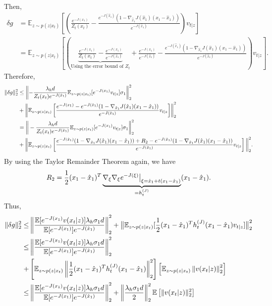 Then, 
\begin{align}
    \nonumber \delta g &= \mathbb{E}_{z \sim p(z|x_t)} 
    \left[
    \left(\frac{e^{-J(x_1)}}{Z_t(x_t)}-\frac{e^{-J(\hat{x}_1)}(1 - \nabla_{\hat{x}_1} J(\hat{x}_1) (x_1 - \hat{x}_1))}{e^{-J(\hat{x}_1)}}\right)v_{t|z}
    \right] \\
    & = \mathbb{E}_{z \sim p(z|x_t)} \left[ 
    \left(\underbrace{\frac{e^{-J({x}_1)}}{Z_t(x_t)} - \frac{e^{-J(x_1)}}{e^{-J(\hat{x}_1)}}}_{\text{Using the error bound of } Z_t} + \frac{e^{-J(x_1)}}{e^{-J(\hat{x}_1)}} -\frac{e^{-J(\hat{x}_1)}(1 - \nabla_{\hat{x}_1} J(\hat{x}_1) (x_1 - \hat{x}_1))}{e^{-J(\hat{x}_1)}}\right)v_{t|z}
    \right].
\end{align}
Therefore,
\begin{align}
    \nonumber \|\delta g\|_2^2& \le \left\|-\frac{\lambda_h d}{Z_t(x_t)e^{-J(\hat{x}_1)}} {\mathbb{E}_{z \sim p(z|x_t)} [e^{-J(x_1)}v_{t|z}]}\sigma_1\right\|_2^2 \\
    \nonumber &+ \left\|\mathbb{E}_{z \sim p(z|x_t)} \left[ 
    \frac{e^{-J(x_1)} - e^{-J(\hat{x}_1)}(1 - \nabla_{\hat{x}_1} J(\hat{x}_1) (x_1 - \hat{x}_1))}{e^{-J(\hat{x}_1)}} v_{t|z}
    \right] \right\|_2^2\\
    \nonumber & = \bigg{\|} -\frac{\lambda_h d}{Z_t(x_t)e^{-J(\hat{x}_1)}} {\mathbb{E}_{z \sim p(z|x_t)} [e^{-J(x_1)}v_{t|z}]}\sigma_1\bigg{\|}_2^2 \\
    & + \bigg{\|}\mathbb{E}_{z \sim p(z|x_t)} \left[ 
    \frac{e^{-J(\hat{x}_1)}(1 - \nabla_{\hat{x}_1} J(\hat{x}_1) (x_1 - \hat{x}_1)) + R_2 - e^{-J(\hat{x}_1)}(1 - \nabla_{\hat{x}_1} J(\hat{x}_1) (x_1 - \hat{x}_1))}{e^{-J(\hat{x}_1)}} v_{t|z}
    \right]\bigg{\|}_2^2.
\end{align}
By using the Taylor Remainder Theorem again, we have 
\begin{equation}
R_2 = \frac{1}{2}(x_1 - \hat{x}_1)^T \underbrace{\nabla_{\xi}\nabla_{\xi} e^{-J(\xi)}\big{|}_{\xi=\hat{x}_1 + t (x_1 - \hat{x}_1)}}_{= h^{(J)}_t}(x_1 - \hat{x}_1).
\end{equation}
Thus,
\begin{align}
    \nonumber \|\delta g\|_2^2\le&\left\|  \frac{\mathbb{E}[e^{-J(x_1)}v(x_t|z)]\lambda_h\sigma_1 d}{\mathbb{E}[e^{-J(x_1)}]e^{-J(\hat{x}_1)}} \right\|_2^2 + \big{\|}\mathbb{E}_{z \sim p(z|x_t)}[\frac{1}{2}(x_1 - \hat{x}_1)^T h_t^{(J)}(x_1 - \hat{x}_1) 
    v_{t|z}
    ]\big{\|}_2^2\\
    \nonumber \le&\left\|  \frac{\mathbb{E}[e^{-J(x_1)}v(x_t|z)]\lambda_h\sigma_1 d}{\mathbb{E}[e^{-J(x_1)}]e^{-J(\hat{x}_1)}} \right\|_2^2 \\
    \nonumber +&
        \left[
            \mathbb{E}_{z \sim p(z|x_t)} 
            \left\|
            \frac{1}{2}(x_1 - \hat{x}_1)^T h_t^{(J)}(x_1 - \hat{x}_1)
            \right\|_2^2
        \right]
        \left[
            \mathbb{E}_{z \sim p(z|x_t)} 
            \left\|
            v(x_t|z)
            \right\|_2^2
        \right]\\
    \le & \left\|  \frac{\mathbb{E}[e^{-J(x_1)}v(x_t|z)]\lambda_h\sigma_1 d}{\mathbb{E}[e^{-J(x_1)}]e^{-J(\hat{x}_1)}} \right\|_2^2 + \left\|\frac{\lambda_h \sigma_1 d}{2} \right\|^2_2 \mathbb{E}\left[\|v(x_t|z)\|_2^2\right]
\end{align}

